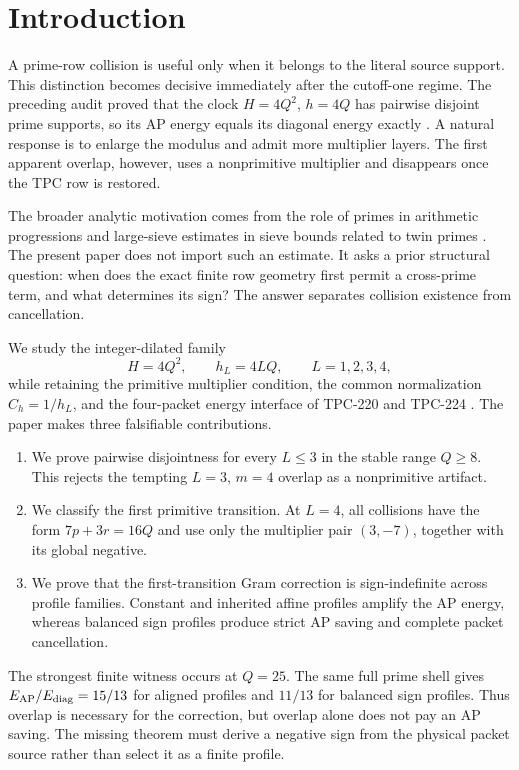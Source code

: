 \section{Introduction}

A prime-row collision is useful only when it belongs to the literal source support.
This distinction becomes decisive immediately after the cutoff-one regime.  The
preceding audit proved that the clock $H=4Q^2$, $h=4Q$ has pairwise disjoint prime
supports, so its AP energy equals its diagonal energy exactly \cite{tpc225}.  A natural
response is to enlarge the modulus and admit more multiplier layers.  The first apparent
overlap, however, uses a nonprimitive multiplier and disappears once the TPC row is
restored.

The broader analytic motivation comes from the role of primes in arithmetic progressions
and large-sieve estimates in sieve bounds related to twin primes
\cite{lichtman2023primes}.  The present paper does not import such an estimate.  It asks
a prior structural question: when does the exact finite row geometry first permit a
cross-prime term, and what determines its sign?  The answer separates collision
existence from cancellation.

We study the integer-dilated family
\[
  H=4Q^2,\qquad h_L=4LQ,\qquad L=1,2,3,4,
\]
while retaining the primitive multiplier condition, the common normalization
$C_h=1/h_L$, and the four-packet energy interface of TPC-220 and TPC-224
\cite{tpc220,tpc224}.  The paper makes three falsifiable contributions.

\begin{enumerate}[leftmargin=2em]
  \item We prove pairwise disjointness for every $L\le3$ in the stable range
  $Q\ge8$.  This rejects the tempting $L=3$, $m=4$ overlap as a nonprimitive
  artifact.
  \item We classify the first primitive transition.  At $L=4$, all collisions have
  the form $7p+3r=16Q$ and use only the multiplier pair $(3,-7)$, together with its
  global negative.
  \item We prove that the first-transition Gram correction is sign-indefinite across
  profile families.  Constant and inherited affine profiles amplify the AP energy,
  whereas balanced sign profiles produce strict AP saving and complete packet
  cancellation.
\end{enumerate}

The strongest finite witness occurs at $Q=25$.  The same full prime shell gives
$E_{\mathrm{AP}}/E_{\mathrm{diag}}=15/13$ for aligned profiles and $11/13$ for balanced sign profiles.
Thus overlap is necessary for the correction, but overlap alone does not pay an AP
saving.  The missing theorem must derive a negative sign from the physical packet
source rather than select it as a finite profile.
